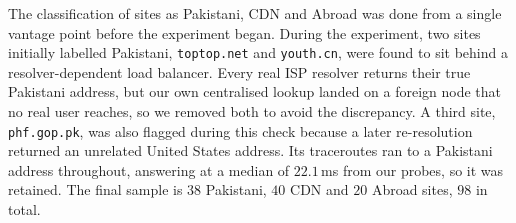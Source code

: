 \documentclass[sigconf,anonymous,10pt]{acmart}
\begin{document}

The classification of sites as Pakistani, CDN and Abroad was done from a single vantage point before the experiment began. During the experiment, two sites initially labelled Pakistani, \texttt{toptop.net} and \texttt{youth.cn}, were found to sit behind a resolver-dependent load balancer. Every real ISP resolver returns their true Pakistani address, but our own centralised lookup landed on a foreign node that no real user reaches, so we removed both to avoid the discrepancy. A third site, \texttt{phf.gop.pk}, was also flagged during this check because a later re-resolution returned an unrelated United States address. Its traceroutes ran to a Pakistani address throughout, answering at a median of $22.1$\,ms from our probes, so it was retained. The final sample is $38$ Pakistani, $40$ CDN and $20$ Abroad sites, $98$ in total.
\end{document}
